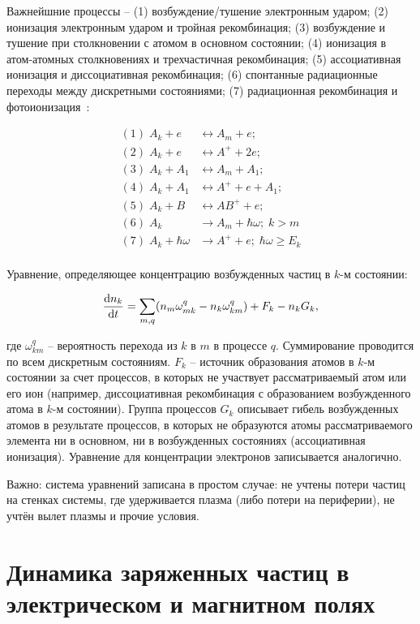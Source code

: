 \documentclass[10pt, a4paper]{article}
\let\stdsection\section
\renewcommand\section{\newpage\stdsection}
\begin{document}
Важнейшние процессы -- (1) возбуждение/тушение электронным ударом; (2) ионизация электронным ударом	и тройная рекомбинация; (3) возбуждение и тушение при столкновении с атомом в основном состоянии; (4) ионизация в атом-атомных столкновениях и трехчастичная рекомбинация; (5) ассоциативная ионизация и диссоциативная рекомбинация; (6) спонтанные радиационные переходы между дискретными состояниями; (7) радиационная рекомбинация и фотоионизация~\cite{biberman}:

\begin{align*}
	(1)\;A_k + e &\leftrightarrow A_m + e;\\
	(2)\;A_k + e &\leftrightarrow A^{+} + 2e;\\
	(3)\;A_k + A_1 &\leftrightarrow A_m + A_1;\\
	(4)\;A_k + A_1 &\leftrightarrow A^{+} + e + A_1;\\
	(5)\;A_k + B &\leftrightarrow AB^{+} + e;\\
	(6)\;A_k &\rightarrow A_m + \hbar\omega;\;k>m\\
	(7)\;A_k + \hbar\omega &\rightarrow A^{+} + e;\;\hbar\omega\geq E_k\\
\end{align*}

Уравнение, определяющее концентрацию возбужденных частиц в $k$-м состоянии:

\begin{equation*}
	\dv{n_k}{t} = \sum\limits_{m, q}(n_m\omega_{mk}^q-n_k\omega_{km}^q)+F_k-n_kG_k,
\end{equation*}

где $\omega_{km}^q$ -- вероятность перехода из $k$ в $m$ в процессе $q$. Суммирование проводится по всем дискретным состояниям. $F_k$ -- источник образования атомов в $k$-м состоянии за счет процессов, в которых не участвует рассматриваемый атом или его ион (например, диссоциативная рекомбинация с образованием возбужденного атома в $k$-м состоянии). Группа процессов $G_k$ описывает гибель возбужденных атомов в результате процессов, в которых не образуются атомы рассматриваемого элемента ни в основном, ни в возбужденных состояниях (ассоциативная ионизация). Уравнение для концентрации электронов записывается аналогично.

Важно: система уравнений записана в простом случае: не учтены потери частиц на стенках системы, где удерживается плазма (либо потери на периферии), не учтён вылет плазмы и прочие условия.

\section{Динамика заряженных частиц в электрическом и магнитном полях} \label{sec:drifts}
\end{document}
